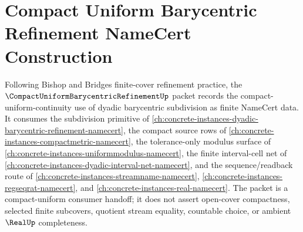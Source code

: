 \chapter{Compact Uniform Barycentric Refinement NameCert Construction}
\label{ch:concrete-instances-compact-uniform-barycentric-refinement-namecert}

Following Bishop and Bridges finite-cover refinement practice, the $\CompactUniformBarycentricRefinementUp$ packet records the compact-uniform-continuity use of dyadic barycentric subdivision as finite NameCert data. It consumes the subdivision primitive of \autoref{ch:concrete-instances-dyadic-barycentric-refinement-namecert}, the compact source rows of \autoref{ch:concrete-instances-compactmetric-namecert}, the tolerance-only modulus surface of \autoref{ch:concrete-instances-uniformmodulus-namecert}, the finite interval-cell net of \autoref{ch:concrete-instances-dyadic-interval-net-namecert}, and the sequence/readback route of \autoref{ch:concrete-instances-streamname-namecert}, \autoref{ch:concrete-instances-regseqrat-namecert}, and \autoref{ch:concrete-instances-real-namecert}. The packet is a compact-uniform consumer handoff; it does not assert open-cover compactness, selected finite subcovers, quotient stream equality, countable choice, or ambient $\RealUp$ completeness.

